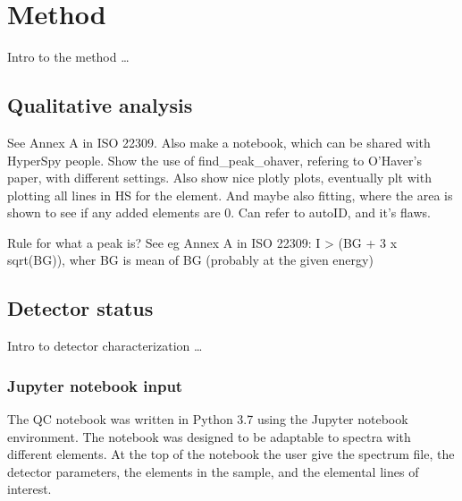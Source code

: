\chapter{Method}
\label{ch:method}

Intro to the method \dots



\section{Qualitative analysis}
\label{method:qualitative_analysis}

See Annex A in ISO 22309. Also make a notebook, which can be shared with HyperSpy people.
Show the use of find_peak_ohaver, refering to O'Haver's paper, with different settings.
Also show nice plotly plots, eventually plt with plotting all lines in HS for the element.
And maybe also fitting, where the area is shown to see if any added elements are 0.
Can refer to autoID, and it's flaws.

Rule for what a peak is? See eg Annex A in ISO 22309: I > (BG + 3 x sqrt(BG)), wher BG is mean of BG (probably at the given energy)


\section{Detector status}
\label{method:detector_status}

Intro to detector characterization \dots

\subsection{Jupyter notebook input}
\label{method:detector_status:input}

The QC notebook was written in Python 3.7 using the Jupyter notebook environment.
The notebook was designed to be adaptable to spectra with different elements.
At the top of the notebook the user give the spectrum file, the detector parameters, the elements in the sample, and the elemental lines of interest.

